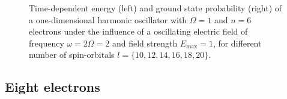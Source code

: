 \begin{figure}[h!]
{\begin{minipage}{0.6\textwidth}
    \end{minipage}
    }
    \caption{Time-dependent energy (left) and ground state probability (right)
        of a one-dimensional harmonic oscillator with $\Omega=1$
        and $n=6$ electrons under the influence of a oscillating electric field 
        of frequency $\omega = 2 \Omega = 2$ and field strength $E_\text{max}=1$,
        for different number of spin-orbitals $l=\{10,12,14,16,18,20\}$.
    }
    \label{fig:1d_n6_qd}
\end{figure}

\subsection*{Eight electrons}

\begin{figure}[!h]
    \centering
\end{figure}
